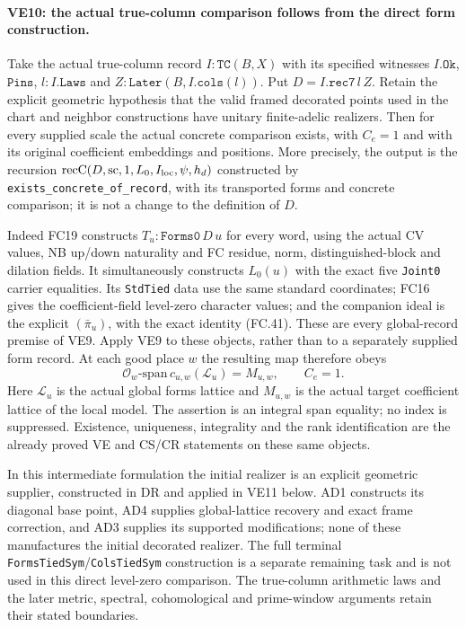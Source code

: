 \paragraph{VE10: the actual true-column comparison follows from the direct form construction.}
Take the actual true-column record $I:\texttt{TC}(B,X)$ with its
specified witnesses $I.\texttt{Ok}$, $\texttt{Pins}$,
$l:I.\texttt{Laws}$ and $Z:\texttt{Later}(B,I.\texttt{cols}(l))$.
Put $D=I.\texttt{rec7}\,l\,Z$. Retain the explicit geometric
hypothesis that the valid framed decorated points used in the chart
and neighbor constructions have unitary finite-adelic realizers.
Then for every supplied scale the actual concrete comparison exists,
with $C_e=1$ and with its original coefficient embeddings and positions.
More precisely, the output is the recursion
$\operatorname{recC}(D,\mathrm{sc},1,L_0,I_{\rm loc},\psi,h_d)$
constructed by \texttt{exists\_concrete\_of\_record}, with its transported
forms and concrete comparison; it is not a change to the definition of $D$.

Indeed FC19 constructs $T_u:\texttt{Forms0}\,D\,u$ for every
word, using the actual CV values, NB up/down naturality and FC residue,
norm, distinguished-block and dilation fields. It simultaneously
constructs $L_0(u)$ with the exact five \texttt{Joint0} carrier
equalities. Its \texttt{StdTied} data use the same standard coordinates;
FC16 gives the coefficient-field level-zero character values; and
the companion ideal is the explicit $(\bar\pi_u)$, with the exact
identity (FC.41). These are every global-record premise of VE9.
Apply VE9 to these objects, rather than to a separately supplied
form record. At each good place $w$ the resulting map therefore obeys
\[
 \mathcal O_w\text{-span}\,
          c_{u,w}(\mathcal L_u)=M_{u,w},\qquad C_e=1. \tag{VE.15}
\]
Here $\mathcal L_u$ is the actual global forms lattice and $M_{u,w}$
is the actual target coefficient lattice of the local model. The
assertion is an integral span equality; no index is suppressed.
Existence, uniqueness, integrality and the rank identification are
the already proved VE and CS/CR statements on these same objects.

In this intermediate formulation the initial realizer is an explicit
geometric supplier, constructed in DR and applied in VE11 below. AD1
constructs its diagonal base point, AD4 supplies global-lattice
recovery and exact frame correction, and AD3 supplies its supported
modifications; none of these manufactures the initial decorated
realizer. The full terminal \texttt{FormsTiedSym}/\texttt{ColsTiedSym}
construction is a separate remaining task and is not used in this
direct level-zero comparison. The true-column arithmetic laws and
the later metric, spectral, cohomological and prime-window arguments
retain their stated boundaries.

